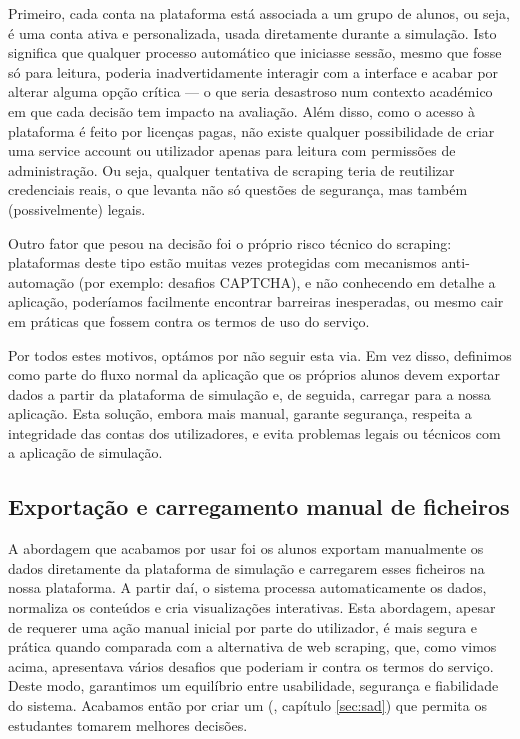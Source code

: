 Primeiro, cada conta na plataforma está associada a um grupo de alunos, ou seja, é uma conta ativa e personalizada, usada diretamente durante a simulação. Isto significa que qualquer processo automático que iniciasse sessão, mesmo que fosse só para leitura, poderia inadvertidamente interagir com a interface e acabar por alterar alguma opção crítica — o que seria desastroso num contexto académico em que cada decisão tem impacto na avaliação. Além disso, como o acesso à plataforma é feito por licenças pagas, não existe qualquer possibilidade de criar uma service account ou utilizador apenas para leitura com permissões de administração. Ou seja, qualquer tentativa de scraping teria de reutilizar credenciais reais, o que levanta não só questões de segurança, mas também (possivelmente) legais.  

Outro fator que pesou na decisão foi o próprio risco técnico do scraping: plataformas deste tipo estão muitas vezes protegidas com mecanismos anti-automação (por exemplo: desafios CAPTCHA), e não conhecendo em detalhe a aplicação, poderíamos facilmente encontrar barreiras inesperadas, ou mesmo cair em práticas que fossem contra os termos de uso do serviço.

Por todos estes motivos, optámos por não seguir esta via. Em vez disso, definimos como parte do fluxo normal da aplicação que os próprios alunos devem exportar dados a partir da plataforma de simulação e, de seguida, carregar para a nossa aplicação. Esta solução, embora mais manual, garante segurança, respeita a integridade das contas dos utilizadores, e evita problemas legais ou técnicos com a aplicação de simulação.

\subsection{Exportação e carregamento manual de ficheiros}

A abordagem que acabamos por usar foi os alunos exportam manualmente os dados diretamente da plataforma de simulação e carregarem esses ficheiros na nossa plataforma. A partir daí, o sistema processa automaticamente os dados, normaliza os conteúdos e cria visualizações interativas. Esta abordagem, apesar de requerer uma ação manual inicial por parte do utilizador, é mais segura e prática quando comparada com a alternativa de web scraping, que, como vimos acima, apresentava vários desafios que poderiam ir contra os termos do serviço. Deste modo, garantimos um equilíbrio entre usabilidade, segurança e fiabilidade do sistema. Acabamos então por criar um  (\cf, capítulo \ref{sec:sad}) que permita os estudantes tomarem melhores decisões.


